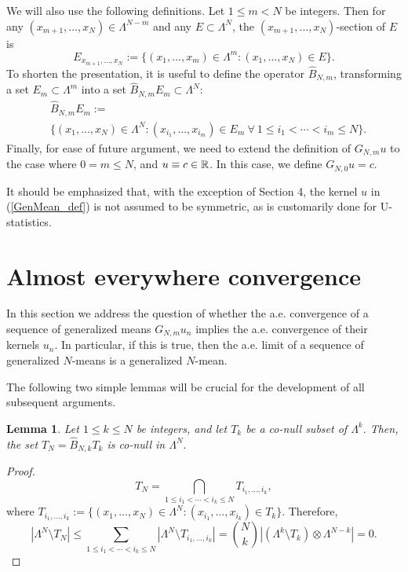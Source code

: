 \documentclass[12pt,leqno]{amsart}
\newtheorem{lem}[theor]{Lemma}{\bf}{\it}
\numberwithin{equation}{section}
\numberwithin{theor}{section}
\numberwithin{rem}{section}
\begin{document}
We will also use the following definitions.  Let $1\leq m < N$ be integers.  Then for any  
$(x_{m+1},...,x_{N})\in \Lambda^{N-m}$ and any $E\subset \Lambda^N$, the $(x_{m+1},...,x_{N})$-section of $E$ is
\begin{equation}
\label{sect_def}
E_{x_{m+1},...,x_{N}}:=\{(x_1,...,x_m)\in\Lambda^m : 
(x_1,...,x_N)\in E\}.
\end{equation}
To shorten the presentation, it is useful to define the operator $\hat{B}_{N,m}$, transforming  
a set $E_m\subset \Lambda^m$ into a set $\hat{B}_{N,m}
E_m\subset \Lambda^N$:  
\begin{equation}
\begin{split}
\label{hatB_def}
&\hat{B}_{N,m}E_{m}:=\\
&\{(x_{1},...,x_{N})\in \Lambda
^{N}:(x_{i_{1}},...,x_{i_{m}})\in E_{m}~\forall~1\leq i_{1}<\cdots <i_{m}\leq N\}.
\end{split}
\end{equation}
Finally, for ease of future argument, we need to extend the definition of $G_{N,m} u$ to the case where $0=m\leq N$, 
and $u\equiv c\in\Bbb{R}$.  In this case, we define $G_{N,0} u=c$.

It should be emphasized that, with the exception of Section 4, the kernel $u$ in (\ref{GenMean_def}) is not assumed to be symmetric, as is customarily done for U-statistics.  

 
\section{Almost everywhere convergence\label{sec_a.e.conv}}

In this section we address the question of whether the a.e. 
convergence of a sequence of generalized means $G_{N,m}u_n$ implies the a.e. convergence of their kernels $u_n$.  In particular, if this is true, then the a.e. limit of a sequence of generalized $N$-means is a generalized 
$N$-mean.    

The following two simple lemmas will be crucial for the 
development of all subsequent arguments.  
\begin{lem}
\label{Lem1}  Let $1\leq k\leq N$ be integers, and let $T_{k}$ be a co-null subset
of $\Lambda ^{k}.$  Then, the set $T_N=\hat{B}_{N,k} T_k$ 
is co-null in $\Lambda ^{N}.$
\end{lem}
\begin{proof}
\begin{equation}
T_N=\bigcap_{1\leq i_{1}<\cdots <i_{k}\leq N} T_{i_{1},...,i_{k}},
\end{equation}
where 
$T_{i_{1},...,i_{k}}:=\{(x_{1},...,x_{N})\in \Lambda^{N}:(x_{i_{1}},...,x_{i_{k}})\in T_{k}\}$.  Therefore,
\begin{equation}
\left | \Lambda^N\setminus T_N\right |\leq 
\sum_{1\leq i_{1}<\cdots <i_{k}\leq N} 
\left | \Lambda^N \setminus T_{i_{1},...,i_{k}}\right |=\binom{N}{k} \left |\left (\Lambda^k\setminus T_k \right )\otimes 
\Lambda^{N-k} \right |=0.
\end{equation}
\end{proof}
\end{document}
